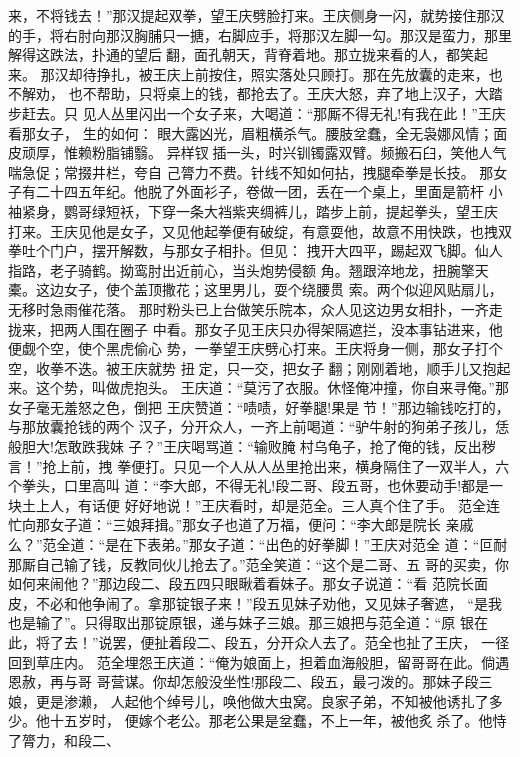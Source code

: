 来，不将钱去！”那汉提起双拳，望王庆劈脸打来。王庆侧身一闪，就势接住那汉
的手，将右肘向那汉胸脯只一搪，右脚应手，将那汉左脚一勾。那汉是蛮力，那里
解得这跌法，扑通的望后翻，面孔朝天，背脊着地。那立拢来看的人，都笑起来。
那汉却待挣扎，被王庆上前按住，照实落处只顾打。那在先放囊的走来，也不解劝，
也不帮助，只将桌上的钱，都抢去了。王庆大怒，弃了地上汉子，大踏步赶去。只
见人丛里闪出一个女子来，大喝道：“那厮不得无礼!有我在此！”王庆看那女子，
生的如何：
眼大露凶光，眉粗横杀气。腰肢坌蠢，全无袅娜风情；面皮顽厚，惟赖粉脂铺翳。
异样钗插一头，时兴钏镯露双臂。频搬石臼，笑他人气喘急促；常掇井栏，夸自
己膂力不费。针线不知如何拈，拽腿牵拳是长技。
那女子有二十四五年纪。他脱了外面衫子，卷做一团，丢在一个桌上，里面是箭杆
小袖紧身，鹦哥绿短袄，下穿一条大裆紫夹绸裤儿，踏步上前，提起拳头，望王庆
打来。王庆见他是女子，又见他起拳便有破绽，有意耍他，故意不用快跌，也拽双
拳吐个门户，摆开解数，与那女子相扑。但见：
拽开大四平，踢起双飞脚。仙人指路，老子骑鹤。拗鸾肘出近前心，当头炮势侵额
角。翘跟淬地龙，扭腕擎天橐。这边女子，使个盖顶撒花；这里男儿，耍个绕腰贯
索。两个似迎风贴扇儿，无移时急雨催花落。
那时粉头已上台做笑乐院本，众人见这边男女相扑，一齐走拢来，把两人围在圈子
中看。那女子见王庆只办得架隔遮拦，没本事钻进来，他便觑个空，使个黑虎偷心
势，一拳望王庆劈心打来。王庆将身一侧，那女子打个空，收拳不迭。被王庆就势
扭定，只一交，把女子翻；刚刚着地，顺手儿又抱起来。这个势，叫做虎抱头。
王庆道：“莫污了衣服。休怪俺冲撞，你自来寻俺。”那女子毫无羞怒之色，倒把
王庆赞道：“啧啧，好拳腿!果是节！”那边输钱吃打的，与那放囊抢钱的两个
汉子，分开众人，一齐上前喝道：“驴牛射的狗弟子孩儿，恁般胆大!怎敢跌我妹
子？”王庆喝骂道：“输败腌村乌龟子，抢了俺的钱，反出秽言！”抢上前，拽
拳便打。只见一个人从人丛里抢出来，横身隔住了一双半人，六个拳头，口里高叫
道：“李大郎，不得无礼!段二哥、段五哥，也休要动手!都是一块土上人，有话便
好好地说！”王庆看时，却是范全。三人真个住了手。
范全连忙向那女子道：“三娘拜揖。”那女子也道了万福，便问：“李大郎是院长
亲戚么？”范全道：“是在下表弟。”那女子道：“出色的好拳脚！”王庆对范全
道：“叵耐那厮自己输了钱，反教同伙儿抢去了。”范全笑道：“这个是二哥、五
哥的买卖，你如何来闹他？”那边段二、段五四只眼瞅着看妹子。那女子说道：“看
范院长面皮，不必和他争闹了。拿那锭银子来！”段五见妹子劝他，又见妹子奢遮，
“是我也是输了”。只得取出那锭原银，递与妹子三娘。那三娘把与范全道：“原
银在此，将了去！”说罢，便扯着段二、段五，分开众人去了。范全也扯了王庆，
一径回到草庄内。
范全埋怨王庆道：“俺为娘面上，担着血海般胆，留哥哥在此。倘遇恩赦，再与哥
哥营谋。你却怎般没坐性!那段二、段五，最刁泼的。那妹子段三娘，更是渗濑，
人起他个绰号儿，唤他做大虫窝。良家子弟，不知被他诱扎了多少。他十五岁时，
便嫁个老公。那老公果是坌蠢，不上一年，被他炙杀了。他恃了膂力，和段二、
